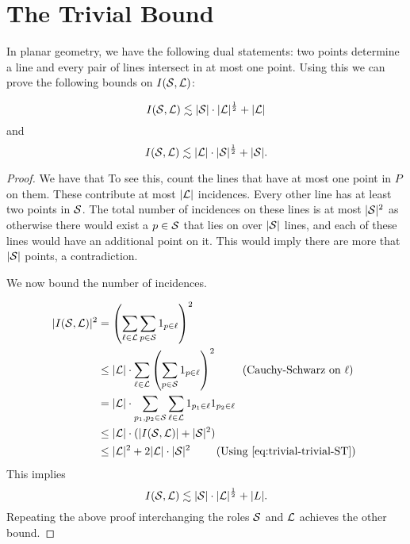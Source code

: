 \section{The Trivial Bound}
In planar geometry, we have the following dual statements: two points determine a line and every pair of lines intersect in at most one point.
Using this we can prove the following bounds on $I(\mathcal S,\mathcal L)$:
\begin{theorem}
    $$I(\mathcal S,\mathcal L) \lesssim |\mathcal S|\cdot |\mathcal L|^{\frac{1}{2}} + |\mathcal L|$$
    and
    $$I(\mathcal S,\mathcal L) \lesssim |\mathcal L|\cdot |\mathcal S|^{\frac{1}{2}} + |\mathcal S|.$$
    \label{thm:trivial-ST-bounds}
\end{theorem}
\begin{proof}
    

We have that 
To see this, count the lines that have at most one point in $P$ on them. These contribute at most $|\mathcal L|$ incidences.
Every other line has at least two points in $\mathcal S$. The total number of incidences on these lines is at most $|\mathcal S|^2$
as otherwise there would exist a $p\in \mathcal S$ that lies on over $|\mathcal S|$ lines, and each of these lines would have an additional 
point on it. This would imply there are more that $|\mathcal S|$ points, a contradiction. 

We now bound the number of incidences. 

\begin{align*}
    |I(\mathcal S,\mathcal L)|^2 &= \left( \sum_{\ell \in \mathcal L} \sum_{p \in \mathcal S} 1_{p\in \ell} \right)^2 \\
    & \leq |\mathcal L|\cdot \sum_{\ell \in \mathcal L} \left( \sum_{p \in \mathcal S} 1_{p\in \ell} \right)^2  \qquad \text{ (Cauchy-Schwarz on $\ell$)}\\
    &= |\mathcal L|\cdot \sum_{p_1,p_2 \in \mathcal S} \sum_{\ell \in \mathcal L}   1_{p_1\in \ell} 1_{p_2\in \ell}    \\
    & \leq |\mathcal L|\cdot ( |I(\mathcal S,\mathcal L)| + |\mathcal S|^2)\\ 
    &\leq |\mathcal L|^2 + 2|\mathcal L|\cdot |\mathcal S|^2 \qquad \text{ (Using \ref{eq:trivial-trivial-ST}) }\\ 
\end{align*}    
This implies
$$I(\mathcal S,\mathcal L) \lesssim |\mathcal S|\cdot |\mathcal L|^{\frac{1}{2}} + |L|.$$ 
Repeating the above proof interchanging the roles $\mathcal S$ and $\mathcal L$ achieves the other bound.
\end{proof}



